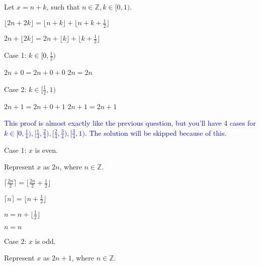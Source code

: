 \documentclass{exam}
\begin{document}
\begin{questions}
\begin{subparts}
\begin{center}

Let \(x = n + k\), such that \(n \in \mathbb{Z}, k \in [0, 1) \).

\( \lfloor 2n + 2k \rfloor = \lfloor n + k \rfloor + \lfloor n + k + \frac{1}{2} \rfloor \)

\( 2n + \lfloor 2k \rfloor = 2n + \lfloor k \rfloor + \lfloor k + \frac{1}{2} \rfloor \)
\vspace{5px}

Case 1: \(k \in [0, \frac{1}{2}) \)

\( 2n + 0 = 2n + 0 + 0 \)
\( 2n = 2n\)
\vspace{5px}

Case 2: \(k \in [\frac{1}{2}, 1) \)

\( 2n + 1 = 2n + 0 + 1 \)
\( 2n + 1 = 2n + 1\)

\end{center}


\begin{center}

\textcolor{blue}{This proof is almost exactly like the previous question, but you'll have 4 cases for \(k \in [0, \frac{1}{4}), [\frac{1}{4}, \frac{2}{4}), [\frac{2}{4}, \frac{3}{4}), [\frac{3}{4}, 1)\). The solution will be skipped because of this.}

\end{center}

\newpage


\begin{center}

Case 1: \(x\) is even.

Represent \(x\) as \(2n\), where \(n \in \mathbb{Z}\).

\( \lceil \frac{2n}{2} \rceil = \lfloor \frac{2n}{2} + \frac{1}{2} \rfloor \)

\( \lceil n \rceil = \lfloor n + \frac{1}{2} \rfloor \)

\( n = n + \lfloor \frac{1}{2} \rfloor \)

\( n = n \)
\vspace{5px}

Case 2: \(x\) is odd.

Represent \(x\) as \(2n + 1\), where \(n \in \mathbb{Z}\).


\end{center}
\end{subparts}
\end{questions}
\end{document}
